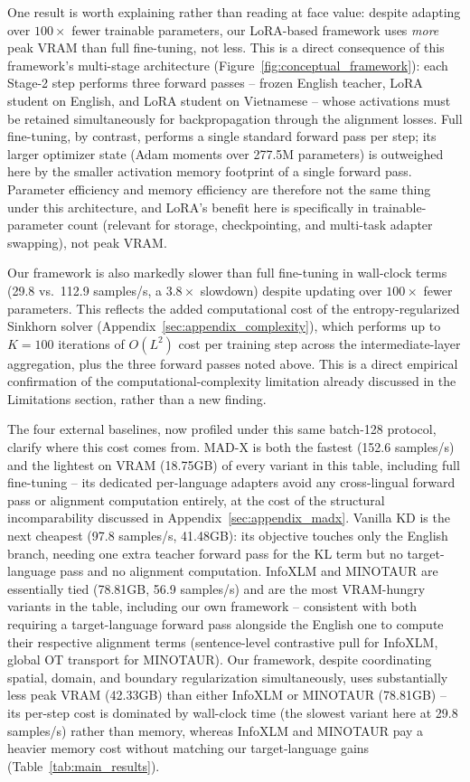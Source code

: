 \documentclass[11pt]{article}
\begin{document}
One result is worth explaining rather than reading at face value: despite adapting over $100\times$ fewer trainable parameters, our LoRA-based framework uses \emph{more} peak VRAM than full fine-tuning, not less. This is a direct consequence of this framework's multi-stage architecture (Figure~\ref{fig:conceptual_framework}): each Stage-2 step performs three forward passes -- frozen English teacher, LoRA student on English, and LoRA student on Vietnamese -- whose activations must be retained simultaneously for backpropagation through the alignment losses. Full fine-tuning, by contrast, performs a single standard forward pass per step; its larger optimizer state (Adam moments over 277.5M parameters) is outweighed here by the smaller activation memory footprint of a single forward pass. Parameter efficiency and memory efficiency are therefore not the same thing under this architecture, and LoRA's benefit here is specifically in trainable-parameter count (relevant for storage, checkpointing, and multi-task adapter swapping), not peak VRAM.

Our framework is also markedly slower than full fine-tuning in wall-clock terms (29.8 vs.\ 112.9 samples/s, a $3.8\times$ slowdown) despite updating over $100\times$ fewer parameters. This reflects the added computational cost of the entropy-regularized Sinkhorn solver (Appendix~\ref{sec:appendix_complexity}), which performs up to $K=100$ iterations of $O(L^2)$ cost per training step across the intermediate-layer aggregation, plus the three forward passes noted above. This is a direct empirical confirmation of the computational-complexity limitation already discussed in the Limitations section, rather than a new finding.

The four external baselines, now profiled under this same batch-128 protocol, clarify where this cost comes from. MAD-X is both the fastest (152.6 samples/s) and the lightest on VRAM (18.75GB) of every variant in this table, including full fine-tuning -- its dedicated per-language adapters avoid any cross-lingual forward pass or alignment computation entirely, at the cost of the structural incomparability discussed in Appendix~\ref{sec:appendix_madx}. Vanilla KD is the next cheapest (97.8 samples/s, 41.48GB): its objective touches only the English branch, needing one extra teacher forward pass for the KL term but no target-language pass and no alignment computation. InfoXLM and MINOTAUR are essentially tied (78.81GB, 56.9 samples/s) and are the most VRAM-hungry variants in the table, including our own framework -- consistent with both requiring a target-language forward pass alongside the English one to compute their respective alignment terms (sentence-level contrastive pull for InfoXLM, global OT transport for MINOTAUR). Our framework, despite coordinating spatial, domain, and boundary regularization simultaneously, uses substantially less peak VRAM (42.33GB) than either InfoXLM or MINOTAUR (78.81GB) -- its per-step cost is dominated by wall-clock time (the slowest variant here at 29.8 samples/s) rather than memory, whereas InfoXLM and MINOTAUR pay a heavier memory cost without matching our target-language gains (Table~\ref{tab:main_results}).
\end{document}
